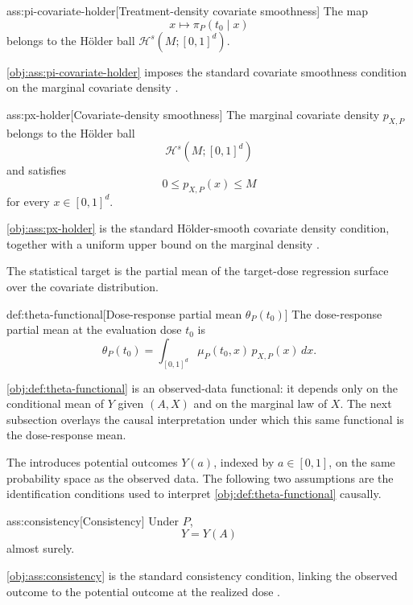 \documentclass[11pt]{article}
\begin{document}
\begin{assumptionv}{ass:pi-covariate-holder}[Treatment-density covariate smoothness]
The map
\[
x\longmapsto \pi_P(t_0\mid x)
\]
belongs to the Hölder ball \(\mathcal H^s(M;[0,1]^d)\).
\end{assumptionv}

\cref{obj:ass:pi-covariate-holder} imposes the standard covariate smoothness condition on the marginal covariate density \citep{bonvini2022}.

\begin{assumptionv}{ass:px-holder}[Covariate-density smoothness]
The marginal covariate density \(p_{X,P}\) belongs to the Hölder ball
\[
\mathcal H^s(M;[0,1]^d)
\]
and satisfies
\[
0 \le p_{X,P}(x) \le M
\]
for every \(x\in[0,1]^d\).
\end{assumptionv}

\cref{obj:ass:px-holder} is the standard Hölder-smooth covariate density condition, together with a uniform upper bound on the marginal density \citep{bonvini2022}.

The statistical target is the partial mean of the target-dose regression surface over the covariate distribution.

\begin{definitionv}{def:theta-functional}[Dose-response partial mean $\theta_P(t_0)$]
The dose-response partial mean at the evaluation dose $t_0$ is
\[
\theta_P(t_0)
=
\int_{[0,1]^d} \mu_P(t_0,x)\,p_{X,P}(x)\,dx .
\]
\end{definitionv}

\cref{obj:def:theta-functional} is an observed-data functional: it depends only on the conditional mean of \(Y\) given \((A,X)\) and on the marginal law of \(X\). The next subsection overlays the causal interpretation under which this same functional is the dose-response mean.

The  introduces potential outcomes \(Y(a)\), indexed by \(a\in[0,1]\), on the same probability space as the observed data. The following two assumptions are the identification conditions used to interpret \cref{obj:def:theta-functional} causally.

\begin{assumptionv}{ass:consistency}[Consistency]
Under \(P\),
\[
Y=Y(A)
\]
almost surely.
\end{assumptionv}

\cref{obj:ass:consistency} is the standard consistency condition, linking the observed outcome to the potential outcome at the realized dose \citep{kennedy2017}.
\end{document}
